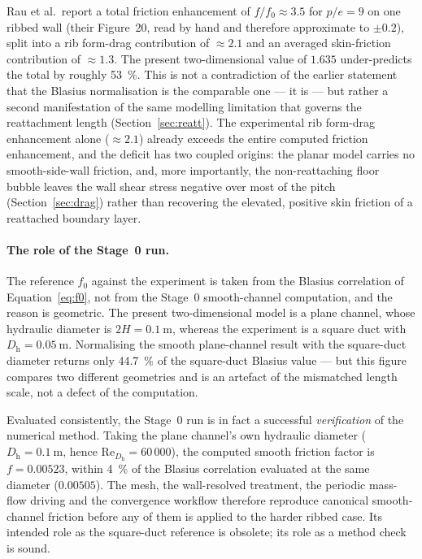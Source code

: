 \documentclass[11pt,a4paper]{article}
\newcommand{\Dh}{D_{\mathrm{h}}}
\newcommand{\Rey}{\mathrm{Re}}
\begin{document}
Rau et al.\ report a total friction enhancement of $f/f_{0} \approx 3.5$ for
$p/e = 9$ on one ribbed wall (their Figure~20, read by hand and therefore
approximate to $\pm 0.2$), split into a rib form-drag contribution of
$\approx 2.1$ and an averaged skin-friction contribution of $\approx 1.3$.
The present two-dimensional value of $1.635$ under-predicts the total by
roughly \SI{53}{\percent}. This is not a contradiction of the earlier
statement that the Blasius normalisation is the comparable one --- it is ---
but rather a second manifestation of the same modelling limitation that
governs the reattachment length (Section~\ref{sec:reatt}). The experimental
rib form-drag enhancement alone ($\approx 2.1$) already exceeds the entire
computed friction enhancement, and the deficit has two coupled origins: the
planar model carries no smooth-side-wall friction, and, more importantly,
the non-reattaching floor bubble leaves the wall shear stress negative over
most of the pitch (Section~\ref{sec:drag}) rather than recovering the
elevated, positive skin friction of a reattached boundary layer.

\paragraph{The role of the Stage~0 run.}
The reference $f_{0}$ against the experiment is taken from the Blasius
correlation of Equation~\eqref{eq:f0}, not from the Stage~0 smooth-channel
computation, and the reason is geometric. The present two-dimensional model
is a plane channel, whose hydraulic diameter is $2H = \SI{0.1}{\meter}$,
whereas the experiment is a square duct with $\Dh = \SI{0.05}{\meter}$.
Normalising the smooth plane-channel result with the square-duct diameter
returns only \SI{44.7}{\percent} of the square-duct Blasius value --- but
this figure compares two different geometries and is an artefact of the
mismatched length scale, not a defect of the computation.

Evaluated consistently, the Stage~0 run is in fact a successful
\emph{verification} of the numerical method. Taking the plane channel's own
hydraulic diameter ($\Dh = \SI{0.1}{\meter}$, hence
$\Rey_{\Dh} = 60\,000$), the computed smooth friction factor is
$f = 0.00523$, within \SI{4}{\percent} of the Blasius correlation evaluated
at the same diameter ($0.00505$). The mesh, the wall-resolved treatment, the
periodic mass-flow driving and the convergence workflow therefore reproduce
canonical smooth-channel friction before any of them is applied to the
harder ribbed case. Its intended role as the square-duct reference is
obsolete; its role as a method check is sound.
\end{document}
